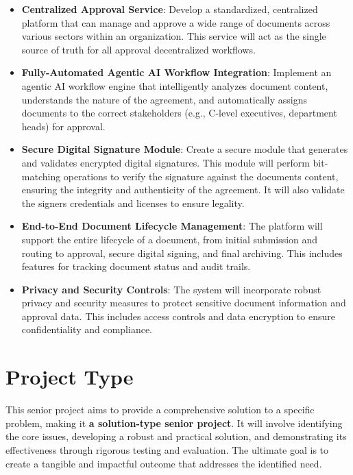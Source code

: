 \documentclass[12pt,oneside,openright,a4paper]{cpe-english-project}
\begin{document}
\begin{itemize}
\item
  \textbf{Centralized Approval Service}: Develop a standardized,
  centralized platform that can manage and approve a wide range of
  documents across various sectors within an organization. This service
  will act as the single source of truth for all approval decentralized
  workflows.
\item
  \textbf{Fully-Automated Agentic AI Workflow Integration}: Implement an
  agentic AI workflow engine that intelligently analyzes document
  content, understands the nature of the agreement, and automatically
  assigns documents to the correct stakeholders (e.g., C-level
  executives, department heads) for approval.
\item
  \textbf{Secure Digital Signature Module}: Create a secure module that
  generates and validates encrypted digital signatures. This module will
  perform bit-matching operations to verify the signature against the
  document\textquotesingle s content, ensuring the integrity and
  authenticity of the agreement. It will also validate the
  signer\textquotesingle s credentials and licenses to ensure legality.
\item
  \textbf{End-to-End Document Lifecycle Management}: The platform will
  support the entire lifecycle of a document, from initial submission
  and routing to approval, secure digital signing, and final archiving.
  This includes features for tracking document status and audit trails.
\item
  \textbf{Privacy and Security Controls}: The system will incorporate
  robust privacy and security measures to protect sensitive document
  information and approval data. This includes access controls and data
  encryption to ensure confidentiality and compliance.
\end{itemize}

\section{Project Type}

This senior project aims to provide a comprehensive solution to a
specific problem, making it \textbf{a solution-type senior project}. It
will involve identifying the core issues, developing a robust and
practical solution, and demonstrating its effectiveness through rigorous
testing and evaluation. The ultimate goal is to create a tangible and
impactful outcome that addresses the identified need.
\end{document}
